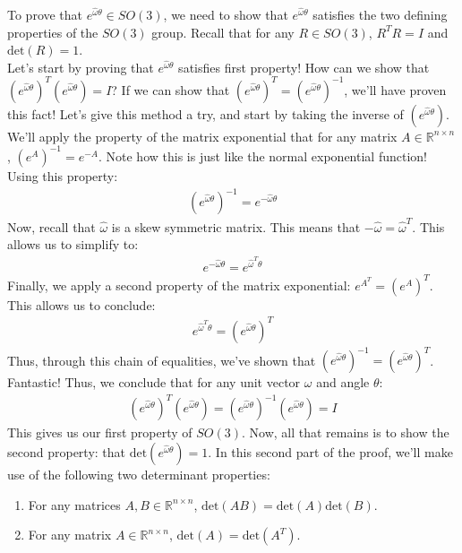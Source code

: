 \documentclass[oneside]{book}
\begin{document}
To prove that $e^{\hat\omega\theta}\in SO(3)$, we need to show that $e^{\hat\omega\theta}$ satisfies the two defining properties of the $SO(3)$ group. Recall that for any $R\in SO(3)$, $R^TR = I$ and $\mathrm{det}(R) = 1$.\\
Let's start by proving that $e^{\hat\omega \theta}$ satisfies first property! How can we show that $(e^{\hat\omega\theta})^T(e^{\hat\omega\theta}) = I$? If we can show that $(e^{\hat\omega\theta})^T = (e^{\hat\omega\theta})^{-1}$, we'll have proven this fact! Let's give this method a try, and start by taking the inverse of $(e^{\hat\omega\theta})$. \\
We'll apply the property of the matrix exponential that for any matrix $A\in \mathbb{R}^{n\times n}$, $(e^A)^{-1} = e^{-A}$. Note how this is just like the normal exponential function!\\
Using this property:
\begin{align}
    (e^{\hat\omega\theta})^{-1} = e^{-\hat\omega\theta}
\end{align}
Now, recall that $\hat\omega$ is a skew symmetric matrix. This means that $-\hat\omega = \hat\omega^T$. This allows us to simplify to:
\begin{align}
    e^{-\hat\omega\theta} = e^{\hat\omega^T\theta}
\end{align}
Finally, we apply a second property of the matrix exponential: $e^{A^T} = (e^{A})^T$. This allows us to conclude:
\begin{align}
    e^{\hat\omega^T\theta} = (e^{\hat\omega\theta})^T
\end{align}
Thus, through this chain of equalities, we've shown that $(e^{\hat\omega\theta})^{-1} = (e^{\hat\omega\theta})^T$. Fantastic! Thus, we conclude that for any unit vector $\omega$ and angle $\theta$:
\begin{align}
    (e^{\hat\omega\theta})^T(e^{\hat\omega\theta}) = (e^{\hat\omega\theta})^{-1}(e^{\hat\omega\theta}) = I
\end{align}
This gives us our first property of $SO(3)$. Now, all that remains is to show the second property: that $\mathrm{det}(e^{\hat\omega\theta})=1$.
In this second part of the proof, we'll make use of the following two determinant properties:
\begin{enumerate}
    \item For any matrices $A, B \in \mathbb{R}^{n\times n}$, $\mathrm{det}(AB) = \mathrm{det}(A)\mathrm{det}(B)$.
    \item For any matrix $A \in \mathbb{R}^{n\times n}$, $\mathrm{det}(A) = \mathrm{det}(A^T)$.
\end{enumerate}
\end{document}
